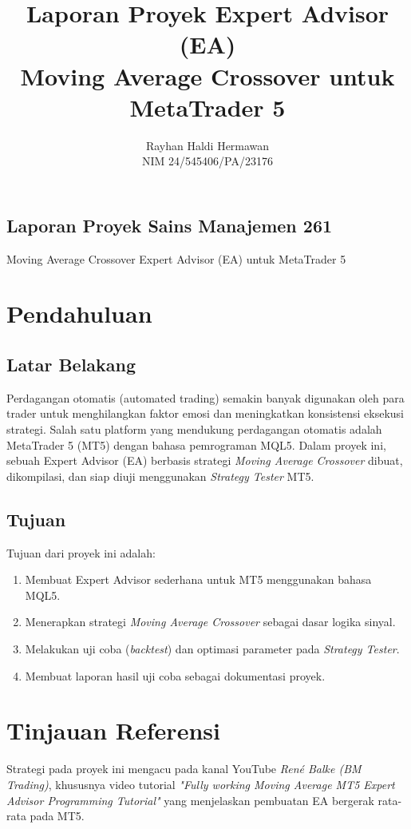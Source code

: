 \documentclass[12pt,a4paper]{article}
\title{\textbf{Laporan Proyek Expert Advisor (EA)\\[0.5em]Moving Average Crossover untuk MetaTrader 5}}
\author{Rayhan Haldi Hermawan\\ NIM 24/545406/PA/23176}
\date{}
\begin{document}
\maketitle
\thispagestyle{empty}
\newpage
{}

\begin{center}
\section*{Laporan Proyek Sains Manajemen 261}
\vspace{0.5em}
{\normalsize Moving Average Crossover Expert Advisor (EA) untuk MetaTrader 5}
\end{center}

\section{Pendahuluan}

\subsection{Latar Belakang}
Perdagangan otomatis (automated trading) semakin banyak digunakan oleh para trader untuk
menghilangkan faktor emosi dan meningkatkan konsistensi eksekusi strategi. Salah satu
platform yang mendukung perdagangan otomatis adalah MetaTrader 5 (MT5) dengan bahasa
pemrograman MQL5. Dalam proyek ini, sebuah Expert Advisor (EA) berbasis strategi
\textit{Moving Average Crossover} dibuat, dikompilasi, dan siap diuji menggunakan
\textit{Strategy Tester} MT5.

\subsection{Tujuan}
Tujuan dari proyek ini adalah:
\begin{enumerate}
\item Membuat Expert Advisor sederhana untuk MT5 menggunakan bahasa MQL5.
\item Menerapkan strategi \textit{Moving Average Crossover} sebagai dasar logika sinyal.
\item Melakukan uji coba (\textit{backtest}) dan optimasi parameter pada \textit{Strategy Tester}.
\item Membuat laporan hasil uji coba sebagai dokumentasi proyek.
\end{enumerate}

\section{Tinjauan Referensi}
Strategi pada proyek ini mengacu pada kanal YouTube
\textit{Ren\'e Balke (BM Trading)}, khususnya video tutorial
\textit{"Fully working Moving Average MT5 Expert Advisor Programming Tutorial"}
yang menjelaskan pembuatan EA bergerak rata-rata pada MT5.
\end{document}

